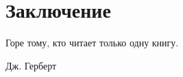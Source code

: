 \chapter*{Заключение}

\epigraph{Горе тому, кто читает только одну книгу.}{Дж. Герберт}

\lipsum[1-7]
